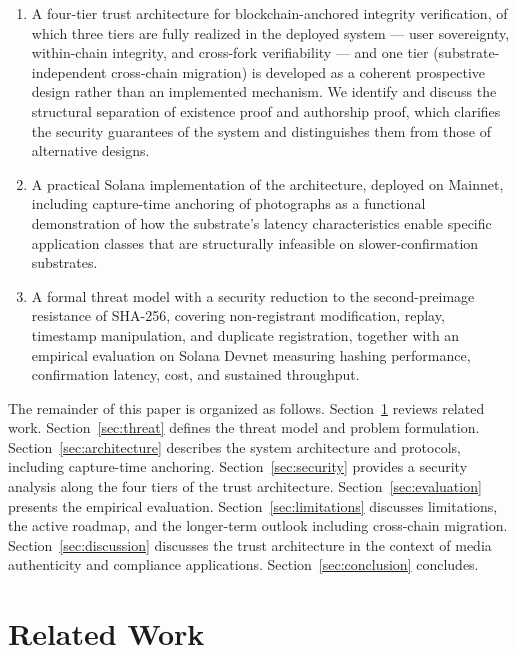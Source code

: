 \documentclass[11pt,a4paper]{article}
\begin{document}
\begin{enumerate}
\item A four-tier trust architecture for blockchain-anchored integrity
verification, of which three tiers are fully realized in the deployed
system --- user sovereignty, within-chain integrity, and cross-fork
verifiability --- and one tier (substrate-independent cross-chain
migration) is developed as a coherent prospective design rather than
an implemented mechanism. We identify and discuss the structural separation
of existence proof and authorship proof, which clarifies the security
guarantees of the system and distinguishes them from those of alternative
designs.
\item A practical Solana implementation of the architecture, deployed on
Mainnet, including capture-time anchoring of photographs as a functional
demonstration of how the substrate's latency characteristics enable
specific application classes that are structurally infeasible on
slower-confirmation substrates.
\item A formal threat model with a security reduction to the
second-preimage resistance of SHA-256, covering non-registrant
modification, replay, timestamp manipulation, and duplicate registration,
together with an empirical evaluation on Solana Devnet measuring hashing
performance, confirmation latency, cost, and sustained throughput.
\end{enumerate}

The remainder of this paper is organized as follows.
Section~\ref{sec:related} reviews related work.
Section~\ref{sec:threat} defines the threat model and problem formulation.
Section~\ref{sec:architecture} describes the system architecture and
protocols, including capture-time anchoring.
Section~\ref{sec:security} provides a security analysis along the four
tiers of the trust architecture.
Section~\ref{sec:evaluation} presents the empirical evaluation.
Section~\ref{sec:limitations} discusses limitations, the active roadmap,
and the longer-term outlook including cross-chain migration.
Section~\ref{sec:discussion} discusses the trust architecture in the
context of media authenticity and compliance applications.
Section~\ref{sec:conclusion} concludes.

\section{Related Work}
\label{sec:related}
\end{document}
